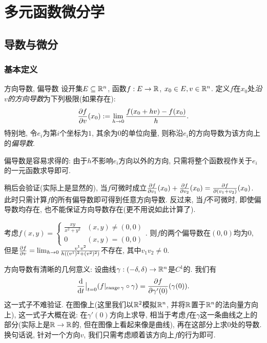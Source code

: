 \chapter{多元函数微分学}

\section{导数与微分}

\subsection{基本定义}

\begin{definition}{方向导数, 偏导数}
    设开集$E \subseteq \mathbb{R} ^n$, 函数$f:E \to \mathbb{R}$, $x_0 \in E , v \in \mathbb{R} ^n$. 定义$f$在$x_0$处\textit{沿$v$的方向导数}为下列极限(如果存在): $$\frac{\partial f}{\partial v}(x_0) := \lim_{h \to 0} \frac{f(x_0+hv)-f(x_0)}{h}.$$
    特别地, 令$e_i$为第$i$个坐标为$1$, 其余为$0$的单位向量, 则称沿$e_i$的方向导数为该方向上的\textit{偏导数}. 
\end{definition}

偏导数是容易求得的: 由于$h$不影响$e_i$方向以外的方向, 只需将整个函数视作关于$e_i$的一元函数求导即可. 

稍后会验证(实际上是显然的), 当$f$可微时成立$\frac{\partial f}{\partial v_1}(x_0) + \frac{\partial f}{\partial v_2}(x_0) = \frac{\partial f}{\partial (v_1+v_2)}(x_0)$. 此时只需计算$f$的所有偏导数即可得到任意方向导数. 反过来, 当$f$不可微时, 即使偏导数均存在, 也不能保证方向导数存在(更不用说如此计算了). 

\begin{example}
	考虑$f(x,y)=\begin{cases}
		\frac{xy}{x^2+y^2} & (x,y) \neq (0,0) \\ 0 & (x,y)=(0,0)
	\end{cases}$. 则$f$的两个偏导数在$(0,0)$均为$0$, 但是$\frac{\partial f}{\partial v} = \lim_{h \to 0} \frac{v^1v^2}{h((v^1)^2+(v^2)^2)}$不存在, 其中$v_1v_2 \neq 0$. 
\end{example}

方向导数有清晰的几何意义: 设曲线$\gamma :(-\delta,\delta) \to \mathbb{R} ^n$是$C^1$的. 我们有$$\frac{\mathop{}\!\mathrm{d}}{\mathop{}\!\mathrm{d} t} \big|_{t=0} (f|_{\operatorname{range} \gamma} \circ \gamma) = \frac{\partial f}{\partial \gamma '(0)} (\gamma (0)). $$
这一式子不难验证. 在图像上(这里我们以$\mathbb{R} ^2$模拟$\mathbb{R} ^n$, 并将$\mathbb{R}$置于$\mathbb{R} ^n$的法向量方向上), 这一式子大概在说: 在$\gamma '(0)$方向上求导, 相当于考虑$f$在$\gamma$这一条曲线之上的部分(实际上是$\mathbb{R} \to \mathbb{R}$的, 但在图像上看起来像是曲线), 再在这部分上求$0$处的导数. 换句话说, 针对一个方向$v$, 我们只需考虑顺着该方向上$f$的行为即可. 

